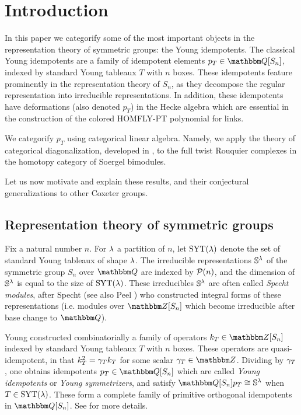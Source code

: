 \section{Introduction}
\label{sec:intro}

In this paper we categorify some of the most important objects in the representation theory of symmetric groups: the Young idempotents. The classical Young idempotents are a family of
idempotent elements $p_T\in \Q[S_n]$, indexed by standard Young tableaux $T$ with $n$ boxes. These idempotents feature prominently in the representation theory of $S_n$, as they
decompose the regular representation into irreducible representations. In addition, these idempotents have deformations (also denoted $p_T$) in the Hecke algebra which are essential in
the construction of the colored HOMFLY-PT polynomial for links.

We categorify $p_T$ using categorical linear algebra. Namely, we apply the theory of categorical diagonalization, developed in \cite{ElHog17a}, to the full twist Rouquier complexes in
the homotopy category of Soergel bimodules.

Let us now motivate and explain these results, and their conjectural generalizations to other Coxeter groups.

\subsection{Representation theory of symmetric groups}

Fix a natural number $n$. For $\lambda$ a partition of $n$, let $\operatorname{SYT}(\lambda)$ denote the set of standard Young tableaux of shape $\lambda$. The irreducible representations ${\mathbb{S}}^\lambda$ of the symmetric
group $S_n$ over $\Q$ are indexed by ${\mathcal{P}}(n)$, and the dimension of ${\mathbb{S}}^\lambda$ is equal to the size of $\operatorname{SYT}(\lambda)$. These irreducibles ${\mathbb{S}}^\lambda$ are often called \emph{Specht modules}, after
Specht \cite{Specht35} (see also Peel \cite{Peel75}) who constructed integral forms of these representations (i.e. modules over $\Z[S_n]$ which become irreducible after base change to
$\Q$).

Young constructed combinatorially a family of operators $k_T \in \Z[S_n]$ indexed by standard Young tableaux $T$ with $n$ boxes. These operators are quasi-idempotent, in that $k_T^2 =
\gamma_T k_T$ for some scalar $\g_T \in \Z$. Dividing by $\gamma_T$, one obtains idempotents $p_T \in \Q[S_n]$ which are called \emph{Young idempotents} or \emph{Young symmetrizers}, and satisfy
$\Q[S_n] p_T \cong \SM^\l$ when $T \in \operatorname{SYT}(\lambda)$. These form a complete family of primitive orthogonal idempotents in $\Q[S_n]$. See \cite{FultonTab} for more details.

